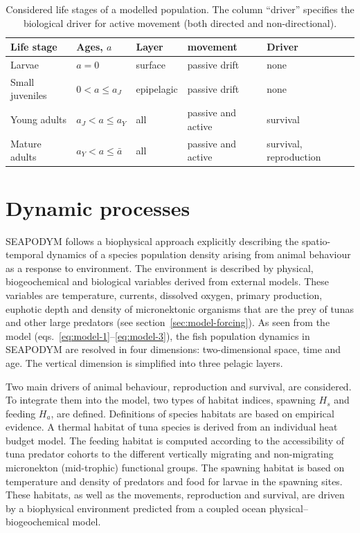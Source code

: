 \begin{table}[!htb]
  \caption{
    Considered life stages of a modelled population. The column ``driver'' specifies the biological driver for active movement (both directed and non-directional).
  }
\centering
  \begin{tabular}{p{2.75cm}|p{2.25cm}|p{1.75cm}|p{3.5cm}|p{4cm}}
  \hline
    \textbf{Life stage} & \textbf{Ages, $a$} & \textbf{Layer} & \textbf{movement} &\textbf{Driver}\\
    \hline   \hline
    Larvae         & $a=0$ & surface & passive drift & none\\
    Small juveniles& $0 < a \leq a_J$ & epipelagic & passive drift & none\\     
    Young adults   & $a_J <  a \leq a_Y$ & all & passive and active & survival \\   
    Mature adults  & $a_Y < a \leq \bar{a}$ & all & passive and active & survival, reproduction\\
    \hline%
  \end{tabular}
\label{tab:life_stages}   
\end{table}

\section{Dynamic processes}
\label{sec:model-dyn}

SEAPODYM follows a biophysical approach explicitly describing the spatio-temporal dynamics of a species population density arising from animal behaviour as a response to environment. The environment is described by physical, biogeochemical and biological variables derived from external models. These variables are temperature, currents, dissolved oxygen, primary production, euphotic depth and density of micronektonic organisms that are the prey of tunas and other large predators (see section~\ref{sec:model-forcing}). As seen from the model (eqs.~\ref{eq:model-1}--\ref{eq:model-3}), the fish population dynamics in SEAPODYM are resolved in four dimensions: two-dimensional space, time and age. The vertical dimension is simplified into three pelagic layers. 

Two main drivers of animal behaviour, reproduction and survival, are considered. To integrate them into the model, two types of habitat indices, spawning $H_s$ and feeding $H_a$, are defined. Definitions of species habitats are based on empirical evidence. A thermal habitat of tuna species is derived from an individual heat budget model. The feeding habitat is computed according to the accessibility of tuna predator cohorts to the different vertically migrating and non-migrating micronekton (mid-trophic) functional groups. The spawning habitat is based on temperature and density of predators and food for larvae in the spawning sites. These habitats, as well as the movements, reproduction and survival, are driven by a biophysical environment predicted from a coupled ocean physical--biogeochemical model. 


